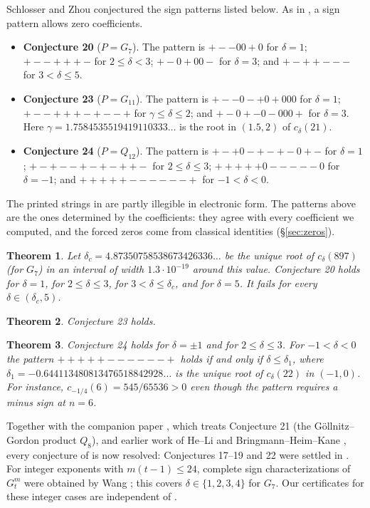 \documentclass[11pt]{amsart}
\newtheorem{theorem}{Theorem}[section]
\theoremstyle{remark}
\begin{document}
Schlosser and Zhou \cite[Appendix A]{SZ} conjectured the sign patterns listed below. As in \cite{SZ}, a sign pattern allows zero coefficients.
\begin{itemize}[leftmargin=2em]
\item \textbf{Conjecture 20} ($P=G_7$). The pattern is $+--00+0$ for $\delta=1$; $+--+++-$ for $2\le\delta<3$; $+-0+00-$ for $\delta=3$; and $+-++---$ for $3<\delta\le5$.
\item \textbf{Conjecture 23} ($P=G_{11}$). The pattern is $+--0-+0+000$ for $\delta=1$; $+--+++-+--+$ for $\gamma\le\delta\le2$; and $+-0+-0-000+$ for $\delta=3$. Here $\gamma=1.7584535519419110333\ldots$ is the root in $(1.5,2)$ of $c_{\delta}(21)$.
\item \textbf{Conjecture 24} ($P=Q_{12}$). The pattern is $+-+0-+-+-0+-$ for $\delta=1$; $+-+--+-+-++-$ for $2\le\delta\le3$; $+++++0-----0$ for $\delta=-1$; and $+++++------+$ for $-1<\delta<0$.
\end{itemize}
The printed strings in \cite{SZ} are partly illegible in electronic form. The patterns above are the ones determined by the coefficients: they agree with every coefficient we computed, and the forced zeros come from classical identities (\S\ref{sec:zeros}).

\begin{theorem}\label{thm:20}
Let $\delta_c=4.87350758538673426336\ldots$ be the unique root of $c_\delta(897)$ (for $G_7$) in an interval of width $1.3\cdot10^{-19}$ around this value. Conjecture 20 holds for $\delta=1$, for $2\le\delta\le3$, for $3<\delta\le\delta_c$, and for $\delta=5$. It fails for every $\delta\in(\delta_c,5)$.
\end{theorem}

\begin{theorem}\label{thm:23}
Conjecture 23 holds.
\end{theorem}

\begin{theorem}\label{thm:24}
Conjecture 24 holds for $\delta=\pm1$ and for $2\le\delta\le3$. For $-1<\delta<0$ the pattern $+++++------+$ holds if and only if $\delta\le\delta_1$, where $\delta_1=-0.644113480813476518842928\ldots$ is the unique root of $c_\delta(22)$ in $(-1,0)$. For instance, $c_{-1/4}(6)=545/65536>0$ even though the pattern requires a minus sign at $n=6$.
\end{theorem}

Together with the companion paper \cite{P1}, which treats Conjecture 21 (the G\"ollnitz--Gordon product $Q_8$), and earlier work of He--Li \cite{HL} and Bringmann--Heim--Kane \cite{BHK}, every conjecture of \cite[Appendix A]{SZ} is now resolved: Conjectures 17--19 and 22 were settled in \cite{HL,BHK}. For integer exponents with $m(t-1)\le24$, complete sign characterizations of $G_t^m$ were obtained by Wang \cite{W}; this covers $\delta\in\{1,2,3,4\}$ for $G_7$. Our certificates for these integer cases are independent of \cite{W}.
\end{document}
